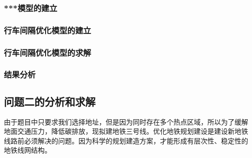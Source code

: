 \documentclass[12pt,a4paper]{mcmthesis}
\begin{document}
    \subsubsection{***模型的建立}

    \subsubsection{行车间隔优化模型的建立}

    \subsubsection{行车间隔优化模型的求解}

    \subsubsection{结果分析}

    \subsection{问题二的分析和求解}
    由于题目中只要求我们选择地址，但是因为同时存在多个热点区域，所以为了缓解地面交通压力，降低碳排放，现拟建地铁三号线。优化地铁规划建设是建设新地铁线路前必须解决的问题。因为科学的规划建造方案，才能形成有层次性、稳定性的地铁线网结构。
\end{document}
